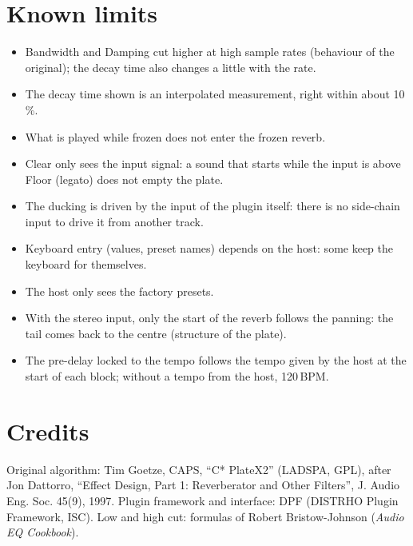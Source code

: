 \documentclass[a4paper,11pt]{article}
\begin{document}
\section{Known limits}\label{sec:limits}
\begin{itemize}
\item Bandwidth and Damping cut higher at high sample rates (behaviour of the original); the
  decay time also changes a little with the rate.
\item The decay time shown is an interpolated measurement, right within about 10\,\%.
\item What is played while frozen does not enter the frozen reverb.
\item Clear only sees the input signal: a sound that starts while the input is above Floor
  (legato) does not empty the plate.
\item The ducking is driven by the input of the plugin itself: there is no side-chain input to
  drive it from another track.
\item Keyboard entry (values, preset names) depends on the host: some keep the keyboard for
  themselves.
\item The host only sees the factory presets.
\item With the stereo input, only the start of the reverb follows the panning: the tail comes
  back to the centre (structure of the plate).
\item The pre-delay locked to the tempo follows the tempo given by the host at the start of each
  block; without a tempo from the host, 120\,BPM.
\end{itemize}

\section{Credits}
Original algorithm: Tim Goetze, CAPS, ``C* PlateX2'' (LADSPA, GPL), after Jon Dattorro,
``Effect Design, Part 1: Reverberator and Other Filters'', J. Audio Eng. Soc. 45(9), 1997.
Plugin framework and interface: DPF (DISTRHO Plugin Framework, ISC). Low and high cut: formulas
of Robert Bristow-Johnson (\emph{Audio EQ Cookbook}).
\end{document}
